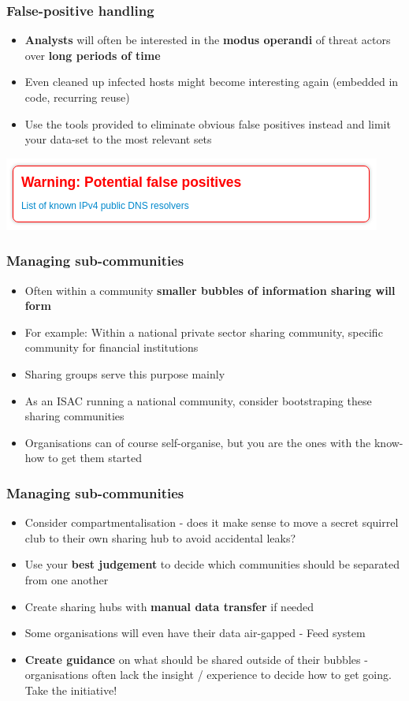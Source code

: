 \begin{frame}
\frametitle{False-positive handling}
\begin{itemize}
    \item {\bf Analysts} will often be interested in the {\bf modus operandi} of threat actors over {\bf long periods of time}
	\item Even cleaned up infected hosts might become interesting again (embedded in code, recurring reuse)
	\item Use the tools provided to eliminate obvious false positives instead and limit your data-set to the most relevant sets
\end{itemize}
\includegraphics[scale=0.8]{screenshots/false-positive.png}
\end{frame}

\begin{frame}
\frametitle{Managing sub-communities}
\begin{itemize}
    \item Often within a community {\bf smaller bubbles of information sharing will form}
	\item For example: Within a national private sector sharing community, specific community for financial institutions
	\item Sharing groups serve this purpose mainly
	\item As an ISAC running a national community, consider bootstraping these sharing communities
	\item Organisations can of course self-organise, but you are the ones with the know-how to get them started
\end{itemize}
\end{frame}

\begin{frame}
\frametitle{Managing sub-communities}
\begin{itemize}
	\item Consider compartmentalisation - does it make sense to move a secret squirrel club to their own sharing hub to avoid accidental leaks?
    \item Use your {\bf best judgement} to decide which communities should be separated from one another
    \item Create sharing hubs with {\bf manual data transfer} if needed
	\item Some organisations will even have their data air-gapped - Feed system
    \item {\bf Create guidance} on what should be shared outside of their bubbles - organisations often lack the insight / experience to decide how to get going. Take the initiative!
\end{itemize}
\end{frame}

